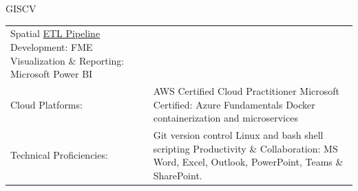 \documentclass[letterpaper]{article}
\newenvironment{skillslist}
        {
            \hspace*{-0.07in}\begin{tabular}[t]{ l L{5.17in} }
        }{
            \end{tabular}
        }
\newcommand{\impt}[1]{\uline{#1}}
\begin{document}
\begin{taggedblock}{GISCV}
\begin{skillslist}
                Spatial \impt{ETL Pipeline} Development: FME \linebreak
                Visualization \& Reporting: Microsoft Power BI \linebreak
                \\
            Cloud Platforms:&
                AWS Certified Cloud Practitioner \linebreak
                Microsoft Certified: Azure Fundamentals \linebreak
                Docker containerization and microservices \linebreak
                \\
            Technical Proficiencies:&
                Git version control \linebreak
                Linux and bash shell scripting \linebreak
                Productivity \& Collaboration: MS Word, Excel, Outlook, PowerPoint, Teams \& SharePoint.
                \\
        \end{skillslist}
    \end{taggedblock}
\end{document}
